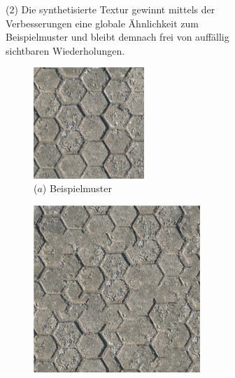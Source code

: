 \begin{figure}
\begin{subfigure}{0.9\textwidth}
	\caption*{($2$) Die synthetisierte Textur gewinnt mittels der Verbesserungen eine globale Ähnlichkeit zum Beispielmuster und bleibt demnach frei von auffällig sichtbaren Wiederholungen.}
\end{subfigure}
\hfill
\begin{subfigure}{0.9\textwidth}
	\centering
	\begin{subfigure}{0.3\textwidth}
		\centering
		\includegraphics[width=0.6\textwidth]{images/example-3-example}
		\caption*{($a$) Beispielmuster}
	\end{subfigure}
	\hfill
	\begin{subfigure}{0.3\textwidth}
		\centering
		\includegraphics[width=0.9\textwidth]{images/example-3-without}

\end{subfigure}
\end{subfigure}
\end{figure}
